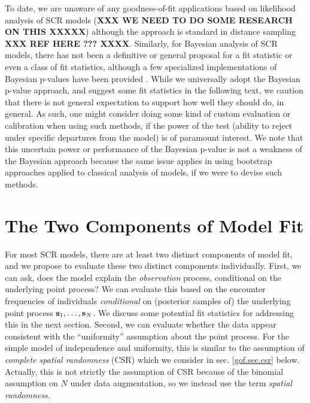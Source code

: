To date, we are unaware of any goodness-of-fit applications based on
likelihood analysis of SCR models ({\bf XXX WE NEED TO DO SOME
  RESEARCH ON THIS XXXXX}) although the approach is standard in
distance sampling {\bf XXX REF HERE ??? XXXX}.  Similarly, for
Bayesian analysis of SCR models, there has not been a definitive or
general proposal for a fit statistic or even a class of fit
statistics, although a few specialized implementations of Bayesian
p-values have been provided \citep{royle:2009,royle_etal:2011mee,
  gopalaswamy_etal:2012ecol,gopalaswamy_etal:2012mee,russell_etal:2012}.
While we universally adopt the Bayesian p-value approach, and suggest
some fit statistics in the following text, we caution that there is
not general expectation to support how well they should do, in
general. As such, one might consider doing some kind of custom
evaluation or calibration when using such methods, if the power of the
test (ability to reject under specific departures from the model) is
of paramount interest.  We note that this uncertain power or
performance of the Bayesian p-value is not a weakness of the Bayesian
approach because the same issue applies in using bootstrap approaches
applied to classical analysis of models, if we were to devise such
methods.




\section{The Two Components of Model Fit}

For most SCR models, there are at least two distinct components of
model fit, and we propose to evaluate these two distinct components
 individually.  First, we can ask, does the model explain the {\it
  observation} process, conditional on the underlying point process?
We can evaluate this based on the encounter frequencies of individuals
{\it conditional} on (posterior samples of) the underlying point
process ${\bf s}_{1}, \ldots, {\bf s}_{N}$.  We discuss some potential
fit statistics for addressing this in the next section.  Second, we
can evaluate whether the data appear consistent with the
``uniformity'' assumption about the point process.  For the simple
model of independence and uniformity, this is similar to the
assumption of {\it complete spatial randomness} (CSR) which we
consider in sec. \ref{gof.sec.csr} below. Actually, this is not
strictly the assumption of CSR because of the binomial assumption on
$N$ under data augmentation, so we instead use the term {\it spatial
  randomness}.


